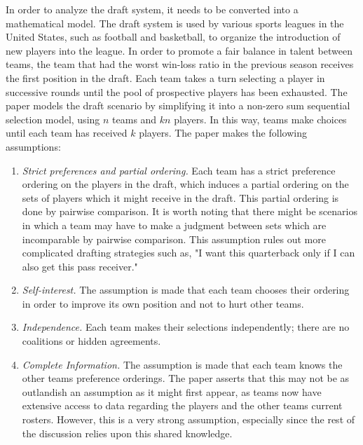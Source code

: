 \documentclass{article}
\begin{document}
In order to analyze the draft system, it needs to be converted into a mathematical model. The draft system is used by various sports leagues in the United States, such as football and basketball, to organize the introduction of new players into the league. In order to promote a fair balance in talent between teams, the team that had the worst win-loss ratio in the previous season receives the first position in the draft. Each team takes a turn selecting a player in successive rounds until the pool of prospective players has been exhausted. The paper models the draft scenario by simplifying it into a non-zero sum sequential selection model, using $n$ teams and $kn$ players. In this way, teams make choices until each team has received $k$ players. The paper makes the following assumptions:

\begin{enumerate}

	\item{\em Strict preferences and partial ordering.} Each team has a strict preference ordering on the players in the draft, which induces a partial ordering on the sets of players which it might receive in the draft. This partial ordering is done by pairwise comparison. It is worth noting that there might be scenarios in which a team may have to make a judgment between sets which are incomparable by pairwise comparison. This assumption rules out more complicated drafting strategies such as, "I want this quarterback only if I can also get this pass receiver."

	\item{\em Self-interest.} The assumption is made that each team chooses their ordering in order to improve its own position and not to hurt other teams. 

	\item{\em Independence.} Each team makes their selections independently; there are no coalitions or hidden agreements.

	\item{\em Complete Information.} The assumption is made that each team knows the other teams preference orderings. The paper asserts that this may not be as outlandish an assumption as it might first appear, as teams now have extensive access to data regarding the players and the other teams current rosters. However, this is a very strong assumption, especially since the rest of the discussion relies upon this shared knowledge.

\end{enumerate}
\end{document}
